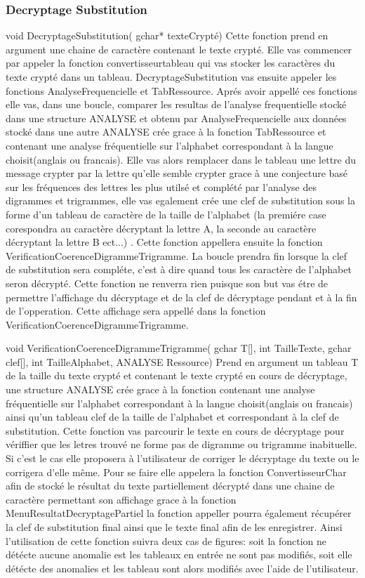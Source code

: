 \documentclass[a4]{article}
\begin{document}
	\subsubsection{Decryptage Substitution}
void DecryptageSubstitution( gchar* texteCrypté)
	Cette fonction prend en argument une chaine de caractère contenant le texte crypté.
	Elle vas commencer par appeler la fonction convertisseurtableau qui vas stocker les  caractères 
	du texte crypté dans un tableau. DecryptageSubstitution vas ensuite appeler les fonctions 
	AnalyseFrequencielle et TabRessource. Aprés avoir appellé ces fonctions elle vas, dans une boucle,
	 comparer les resultas de l'analyse frequentielle stocké dans une structure ANALYSE et obtenu par 
	 AnalyseFrequencielle aux données stocké dans une autre ANALYSE crée grace à la fonction TabRessource 
	 et contenant une analyse fréquentielle sur l'alphabet correspondant à la langue choisit(anglais ou 
	 francais). Elle vas alors remplacer dans le tableau une lettre du message crypter par la lettre qu'elle
	  semble crypter grace à une conjecture basé sur les fréquences des lettres les plus utilsé et 
	  complété par l'analyse des digrammes et trigrammes, elle vas egalement crée une clef de 
	  substitution sous la forme d'un tableau de caractère de la taille de l'alphabet (la premiére case 
	  corespondra au caractère décryptant la lettre A, la seconde au caractère décryptant la lettre B ect...)
	  . Cette fonction appellera ensuite la fonction VerificationCoerenceDigrammeTrigramme. La boucle 
	  prendra fin lorsque la clef de substitution sera compléte, c'est à dire quand tous les caractère
	   de l'alphabet seron décrypté.
	Cette fonction ne renverra rien puisque son but vas étre de permettre l'affichage du décryptage et 
	de la clef de décryptage pendant et à la fin de l'opperation. Cette affichage sera appellé dans la
	 fonction VerificationCoerenceDigrammeTrigramme.


void VerificationCoerenceDigrammeTrigramme( gchar T[], int TailleTexte, gchar clef[], int TailleAlphabet, 
ANALYSE Ressource)
	Prend en argument un tableau T de la taille du texte crypté et contenant le texte crypté en cours de
	 décryptage, une structure ANALYSE crée grace à la fonction contenant une analyse fréquentielle sur 
	 l'alphabet correspondant à la langue choisit(anglais ou francais) ainsi qu'un tableau clef de la
	  taille de l'alphabet et correspondant à la clef de substitution.
	Cette fonction vas parcourir le texte en cours de décryptage pour vériffier que les letres trouvé ne
	 forme pas de digramme ou trigramme inabituelle. Si c'est le cas elle proposera à l'utilisateur de 
	 corriger le décryptage du texte ou le corrigera d'elle même. Pour se faire elle appelera la fonction
	  ConvertisseurChar afin de stocké le résultat du texte partiellement décrypté dans une chaine de 
	  caractère permettant son affichage grace à la fonction 
   MenuResultatDecryptagePartiel la fonction appeller pourra également récupérer la clef
 de substitution final ainsi que le texte final afin de les enregistrer. Ainsi l'utilisation de cette
  fonction suivra deux cas
de figures: soit la fonction ne détécte aucune anomalie est les tableaux en entrée ne sont pas modifiés,
 soit elle détécte des anomalies et les tableau sont alors modifiés avec l'aide de l'utilisateur.
	
\end{document}
